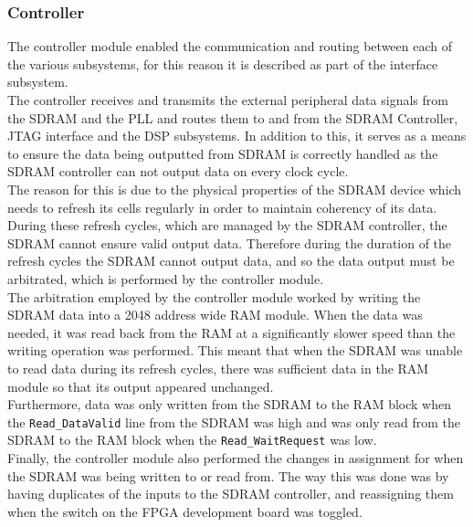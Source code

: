 		\subsubsection{Controller} 
		\noindent The controller module enabled the communication and routing between each of the various subsystems, for this reason it is described as part of the interface subsystem. \\ \newline  The controller receives and transmits the external peripheral data signals from the SDRAM and the PLL and routes them to and from the SDRAM Controller, JTAG interface and the DSP subsystems. In addition to this, it serves as a means to ensure the data being outputted from SDRAM is correctly handled as the SDRAM controller can not output data on every clock cycle. \\ \newline The reason for this is due to the physical properties of the SDRAM device which needs to refresh its cells regularly in order to maintain coherency of its data. During these refresh cycles, which are managed by the SDRAM controller, the SDRAM cannot ensure valid output data. Therefore during the duration of the refresh cycles the SDRAM cannot output data, and so the data output must be arbitrated, which is performed by the controller module.    \\ \newline  The arbitration employed by the controller module worked by writing the SDRAM data into a 2048 address wide RAM module. When the data was needed, it was read back from the RAM at a significantly slower speed than the writing operation was performed. This meant that when the SDRAM was unable to read data during its refresh cycles, there was sufficient data in the RAM module so that its output appeared unchanged.\\ \newline Furthermore, data was only written from the SDRAM to the RAM block when the \texttt{Read\_DataValid} line from the SDRAM was high and was only read from the SDRAM to the RAM block when the   \texttt{Read\_WaitRequest} was low.  \\ \newline Finally, the controller module also performed the changes in assignment for when the SDRAM was being written to or read from. The way this was done was by having duplicates of the inputs to the SDRAM controller, and reassigning them when the switch on the FPGA development board was toggled.
		
